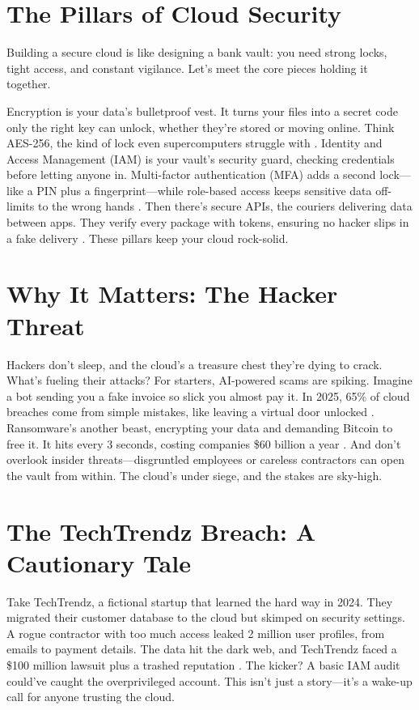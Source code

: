 \documentclass[a4paper,10pt,twocolumn]{memoir}
\begin{document}
\section*{The Pillars of Cloud Security}

Building a secure cloud is like designing a bank vault: you need strong locks, tight access, and constant vigilance. Let’s meet the core pieces holding it together.

Encryption is your data’s bulletproof vest. It turns your files into a secret code only the right key can unlock, whether they’re stored or moving online. Think AES-256, the kind of lock even supercomputers struggle with \cite{cloudsec2025}. Identity and Access Management (IAM) is your vault’s security guard, checking credentials before letting anyone in. Multi-factor authentication (MFA) adds a second lock—like a PIN plus a fingerprint—while role-based access keeps sensitive data off-limits to the wrong hands \cite{csrc2024}. Then there’s secure APIs, the couriers delivering data between apps. They verify every package with tokens, ensuring no hacker slips in a fake delivery \cite{apisec2025}. These pillars keep your cloud rock-solid.

\section*{Why It Matters: The Hacker Threat}

Hackers don’t sleep, and the cloud’s a treasure chest they’re dying to crack. What’s fueling their attacks? For starters, AI-powered scams are spiking. Imagine a bot sending you a fake invoice so slick you almost pay it. In 2025, 65\% of cloud breaches come from simple mistakes, like leaving a virtual door unlocked \cite{cloudsec2025}. Ransomware’s another beast, encrypting your data and demanding Bitcoin to free it. It hits every 3 seconds, costing companies \$60 billion a year \cite{cloudsec2025}. And don’t overlook insider threats—disgruntled employees or careless contractors can open the vault from within. The cloud’s under siege, and the stakes are sky-high.

\section*{The TechTrendz Breach: A Cautionary Tale}

Take TechTrendz, a fictional startup that learned the hard way in 2024. They migrated their customer database to the cloud but skimped on security settings. A rogue contractor with too much access leaked 2 million user profiles, from emails to payment details. The data hit the dark web, and TechTrendz faced a \$100 million lawsuit plus a trashed reputation \cite{technews2024}. The kicker? A basic IAM audit could’ve caught the overprivileged account. This isn’t just a story—it’s a wake-up call for anyone trusting the cloud.
\end{document}

